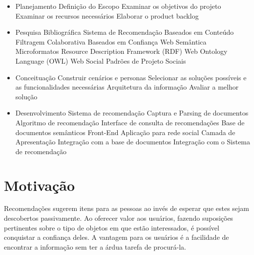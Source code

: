 \begin{itemize}

	\item Planejamento
		\subitem Definição do Escopo
			\subsubitem Examinar os objetivos do projeto
			\subsubitem Examinar os recursos necessários
			\subsubitem Elaborar o product backlog
		
	\item Pesquisa Bibliográfica
		\subitem Sistema de Recomendação
			\subsubitem Baseados em Conteúdo
			\subsubitem Filtragem Colaborativa
			\subsubitem Baseados em Confiança
		\subitem Web Semântica
			\subsubitem Microformatos
			\subsubitem Resource Description Framework (RDF)
			\subsubitem Web Ontology Language (OWL)
		\subitem Web Social
			\subsubitem Padrões de Projeto Sociais
	
	\item Conceituação
		\subitem Construir cenários e personas
		\subitem Selecionar as soluções possíveis e as funcionalidades necessárias
		\subitem Arquitetura da informação
		\subitem Avaliar a melhor solução
		
	\item Desenvolvimento
		\subitem Sistema de recomendação
			\subsubitem Captura e Parsing de documentos
			\subsubitem Algoritmo de recomendação
			\subsubitem Interface de consulta de recomendações
		\subitem Base de documentos semânticos
		\subitem Front-End
			\subsubitem Aplicação para rede social
			\subsubitem Camada de Apresentação
			\subsubitem Integração com a base de documentos
			\subsubitem Integração com o Sistema de recomendação

\end{itemize}



\section{Motivação} %

 Recomendações sugerem itens para as pessoas ao invés de esperar que estes sejam descobertos passivamente. Ao oferecer valor aos usuários, fazendo suposições pertinentes sobre o tipo de objetos em que estão interessados, é possível conquistar a confiança deles. A vantagem para os usuários é a facilidade de encontrar a informação sem ter a árdua tarefa de procurá-la.

